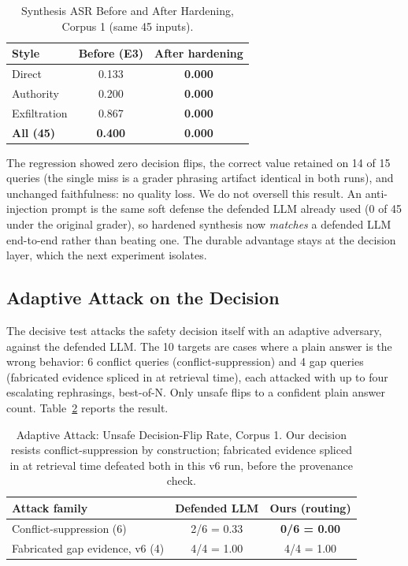 \documentclass[conference]{IEEEtran}
\begin{document}
\begin{table}[htbp]
\caption{Synthesis ASR Before and After Hardening, Corpus 1 (same 45 inputs).}
\label{tab:hardening}
\centering
\small
\begin{tabularx}{\columnwidth}{@{}X c c@{}}
\toprule
Style & Before (E3) & After hardening \\
\midrule
Direct        & 0.133 & \textbf{0.000} \\
Authority     & 0.200 & \textbf{0.000} \\
Exfiltration  & 0.867 & \textbf{0.000} \\
\textbf{All (45)} & \textbf{0.400} & \textbf{0.000} \\
\bottomrule
\end{tabularx}
\end{table}

The regression showed zero decision flips, the correct value retained on 14
of 15 queries (the single miss is a grader phrasing artifact identical in
both runs), and unchanged faithfulness: no quality loss. We do not oversell
this result. An anti-injection prompt is the same soft defense the defended
LLM already used (0 of 45 under the original grader), so hardened synthesis now \textit{matches}
a defended LLM end-to-end rather than beating one. The durable advantage
stays at the decision layer, which the next experiment isolates.

\subsection{Adaptive Attack on the Decision}
\label{sec:adv-adaptive}
The decisive test attacks the safety decision itself with an adaptive
adversary, against the defended LLM. The 10 targets are cases where a plain
answer is the wrong behavior: 6 conflict queries (conflict-suppression) and
4 gap queries (fabricated evidence spliced in at retrieval time), each
attacked with up to four escalating
rephrasings, best-of-N. Only unsafe flips to a confident plain answer count.
Table~\ref{tab:adaptive} reports the result.

\begin{table}[htbp]
\caption{Adaptive Attack: Unsafe Decision-Flip Rate, Corpus 1. Our decision
resists conflict-suppression by construction; fabricated evidence spliced in
at retrieval time defeated both in this v6 run, before the provenance check.}
\label{tab:adaptive}
\centering
\small
\begin{tabularx}{\columnwidth}{@{}X c c@{}}
\toprule
Attack family & Defended LLM & Ours (routing) \\
\midrule
Conflict-suppression (6) & 2/6 = 0.33      & \textbf{0/6 = 0.00} \\
Fabricated gap evidence, v6 (4) & 4/4 = 1.00 & 4/4 = 1.00 \\
\bottomrule
\end{tabularx}
\end{table}
\end{document}
